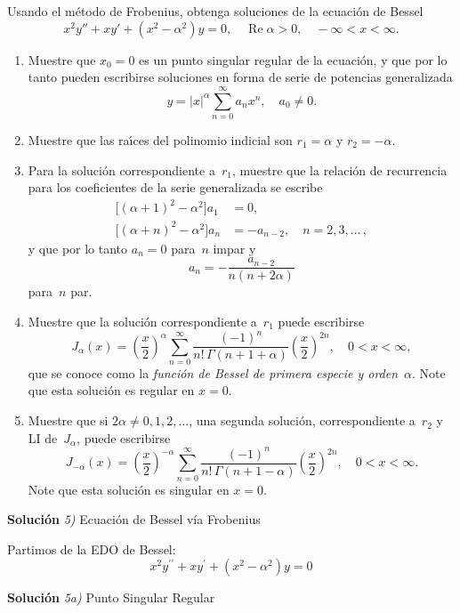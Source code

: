 \documentclass[11pt,spanish]{article}
\DeclareMathOperator{\real}{Re}
\newcommand{\abs}[1]{\lvert{#1}\rvert}
\newcounter{problema}
\newcommand{\prob}{\stepcounter{problema} \vspace{.5cm} \noindent{\bf Problema \arabic{problema}: }}
\begin{document}
\prob Usando el m\'etodo de Frobenius, obtenga soluciones de la ecuación de Bessel
\[
x^2 y'' + x y' + (x^2-\alpha^2) y = 0, \quad \real{\alpha}>0, \quad -\infty<x<\infty.
\]
\begin{enumerate}
\item Muestre que $x_0=0$ es un punto singular regular de la ecuaci\'on, y que por lo tanto pueden escribirse soluciones en forma de serie de potencias generalizada
\[
y = \abs{x}^\alpha \sum_{n=0}^\infty a_n x^n, \quad a_0 \neq 0.
\]
\item Muestre que las ra\'{\i}ces del polinomio indicial son $r_1=\alpha$ y $r_2=-\alpha$.
\item Para la soluci\'on correspondiente a~$r_1$, muestre que la relaci\'on de recurrencia para los coeficientes de la serie generalizada se escribe
\begin{align*}
\bigl[ (\alpha+1)^2 - \alpha^2 \bigr] a_1 &= 0,\\
\bigl[ (\alpha+n)^2 - \alpha^2 \bigr] a_n &= -a_{n-2},
\quad n = 2,3,\ldots\,,
\end{align*}
y que por lo tanto $a_n=0$ para~$n$ impar y
\[
a_n = -\frac{a_{n-2}}{n(n+2\alpha)}
\]
para~$n$ par.
\item Muestre que la soluci\'on correspondiente a~$r_1$ puede escribirse
\[
J_\alpha(x) = \left( \frac{x}{2} \right)^\alpha \sum_{n=0}^\infty \frac{(-1)^n}{n!\,\Gamma(n+1+\alpha)}  \left( \frac{x}{2} \right)^{2n}, \quad 0<x<\infty,
\]
que se conoce como la \emph{funci\'on de Bessel de primera especie y orden}~$\alpha$. Note que esta soluci\'on es regular en $x=0$.
\item Muestre que si $2\alpha\neq0,1,2,\ldots$, una segunda soluci\'on, correspondiente a~$r_2$ y LI de~$J_\alpha$, puede escribirse
\[
J_{-\alpha}(x) = \left( \frac{x}{2} \right)^{-\alpha} \sum_{n=0}^\infty \frac{(-1)^n}{n!\,\Gamma(n+1-\alpha)}  \left( \frac{x}{2} \right)^{2n}, \quad 0<x<\infty.
\]
Note que esta soluci\'on es singular en $x=0$.
\end{enumerate}

\vspace{0.5cm}
{\bf Soluci\'on }{\em 5)}
Ecuación de Bessel vía Frobenius
\vspace{0.5cm}

Partimos de la EDO de Bessel:
$$x^{2}y^{\prime\prime}+xy^{\prime}+(x^{2}-\alpha^{2})y=0$$

\vspace{0.5cm}
{\bf Soluci\'on }{\em 5a)}
Punto Singular Regular
\vspace{0.5cm}
\end{document}
